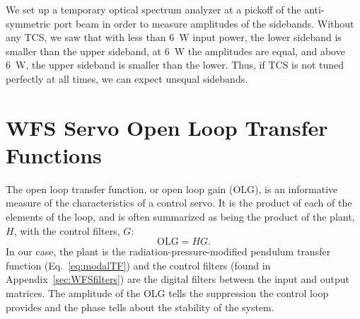 We set up a temporary optical spectrum analyzer at a pickoff of the
anti-symmetric port beam in order to measure amplitudes of the
sidebands. Without any TCS, we saw that with less than 6~W input
power, the lower sideband is smaller than the upper sideband, at 6~W
the amplitudes are equal, and above 6~W, the upper sideband is smaller
than the lower. Thus, if TCS is not tuned perfectly at all times, we
can expect unequal sidebands.










\section{WFS Servo Open Loop Transfer Functions}
\label{sec:WFSolgs}

The open loop transfer function, or open loop gain (OLG), is an
informative measure of the characteristics of a control servo. It is
the product of each of the elements of the loop, and is often
summarized as being the product of the plant, $H$, with the control
filters, $G$:
\begin{equation}
\mathrm{OLG} = HG.
\end{equation}
In our case, the plant is the radiation-pressure-modified pendulum
transfer function (Eq.~\ref{eq:modalTF}) and the control filters
(found in Appendix~\ref{sec:WFSfilters}) are the digital filters
between the input and output matrices. The amplitude of the OLG tells
the suppression the control loop provides and the phase tells about
the stability of the system.

